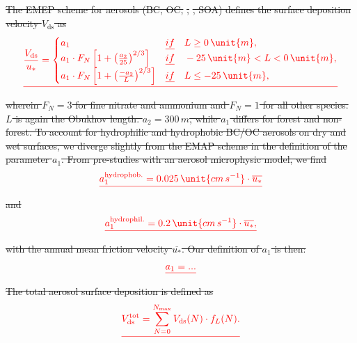 \documentclass[gmd, manuscript]{copernicus}
\providecommand{\DIFdel}[1]{{\protect\color{red}\sout{#1}}}                      %
\begin{document}
\DIFdel{The EMEP scheme for aerosols (BC, OC, }%
\DIFdel{, }%
\DIFdel{, SOA) defines the surface deposition velocity $V_\text{ds}$ as
}\begin{displaymath}
  \DIFdel{\frac{V_\text{ds}}{u_*} =
  \begin{cases}
    a_1 &  \emph{if} \quad L \ge 0\,\unit{m}, \\
    a_1 \cdot F_N \left[ 1 + \left(\frac{a_2}{25}\right)^{2/3}\right] & \emph{if} \quad -25\,\unit{m} < L < 0\,\unit{m}, \\
    a_1 \cdot F_N \left[ 1 + \left(\frac{-a_2}{L}\right)^{2/3}\right] & \emph{if} \quad L \le -25\,\unit{m}, \\
  \end{cases}
}\end{displaymath}
\DIFdel{wherein $F_N = 3$ for fine nitrate and ammonium and $F_N = 1$ for all other species. $L$ is again the Obukhov length. $a_2 = 300\,\unit{m}$, while $a_1$ differs for forest and non-forest. To account for hydrophilic and hydrophobic BC/OC aerosols on dry and wet surfaces, we diverge slightly from the EMAP scheme in the definition of the parameter $a_1$. From pre-studies with an aerosol microphysic model, we find
}\begin{displaymath}
  \DIFdel{a_1^\text{hydrophob.} = 0.025\,\unit{cm\,s^{-1}} \cdot \overline{u_*}
}\end{displaymath}
\DIFdel{and
}\begin{displaymath} 
  \DIFdel{a_1^\text{hydrophil.} = 0.2\,\unit{cm\,s^{-1}} \cdot \overline{u_*},
}\end{displaymath}
\DIFdel{with the annual mean friction velocity $\overline{u_*}$. Our definition of $a_1$ is then:
}\begin{displaymath}
  \DIFdel{a_1 = ...
    \label{eq:dd_aerosol_a1}
}\end{displaymath}
\DIFdel{The total aerosol surface deposition is defined as
}\begin{displaymath}
 \DIFdel{V_\text{ds}^\text{tot} = \sum_{N=0}^{N_\text{max}} V_\text{ds}(N) \cdot f_L(N).
}\end{displaymath}
\end{document}
